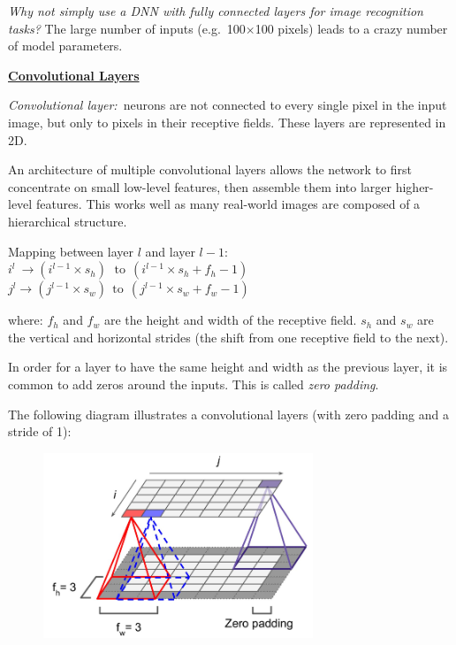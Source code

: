 \textit{Why not simply use a DNN with fully connected layers for image recognition tasks?}\newline
The large number of inputs (e.g.~100$\times$100 pixels) leads to a crazy number of model parameters.\newline

\textbf{\underline{Convolutional Layers}}

\textit{Convolutional layer:}~neurons are not connected to every single pixel in the input image,
but only to pixels in their receptive fields. These layers are represented in 2D.

An architecture of multiple convolutional layers allows the network to first concentrate on small low-level features,
then assemble them into larger higher-level features.
This works well as many real-world images are composed of a hierarchical structure.

Mapping between layer $l$ and layer $l-1$:\newline
$i^{l} ~\rightarrow (i^{l-1} \times s_h)~~\,\textrm{to}~~(i^{l-1} \times s_h + f_h -1)$\newline
$j^{l} \rightarrow (j^{l-1} \times s_w)~~\textrm{to}~~(j^{l-1} \times s_w + f_w -1)$

where:\newline
$f_h$ and $f_w$ are the height and width of the receptive field.\newline
$s_h$ and $s_w$ are the vertical and horizontal strides (the shift from one receptive field to the next).

In order for a layer to have the same height and width as the previous layer,
it is common to add zeros around the inputs. This is called \textit{zero padding}.

The following diagram illustrates a convolutional layers (with zero padding and a stride of 1):

\begin{figure}[ht]
\centering
\includegraphics[width=0.72\textwidth]{./images/conv_layer.png}
\end{figure}

